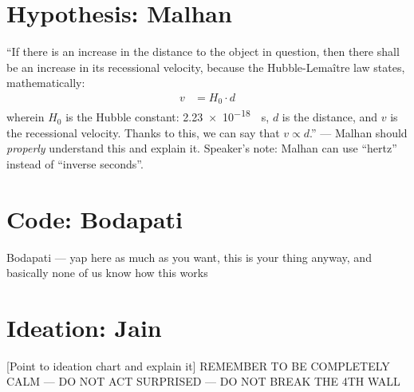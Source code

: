 \documentclass{article}
\begin{document}
\section{Hypothesis: Malhan}
\enquote{If there is an increase in the distance to the object in question, then there shall be an increase in its recessional velocity, because the Hubble-Lemaître law states, mathematically:
\begin{align}
    v &= H_0 \cdot d
\end{align}
wherein \(H_0\) is the Hubble constant: \qty{2.23e-18}{\per\second}, \(d\) is the distance, and \(v\) is the recessional velocity. Thanks to this, we can say that \(v \propto d\).} --- Malhan should \emph{properly} understand this and explain it. Speaker's note: Malhan can use \enquote{hertz} instead of \enquote{inverse seconds}.
\section{Code: Bodapati}
Bodapati --- yap here as much as you want, this is your thing anyway, and basically none of us know how this works
\section{Ideation: Jain}
[Point to ideation chart and explain it]
REMEMBER TO BE COMPLETELY CALM --- DO NOT ACT SURPRISED --- DO NOT BREAK THE 4TH WALL
\end{document}
